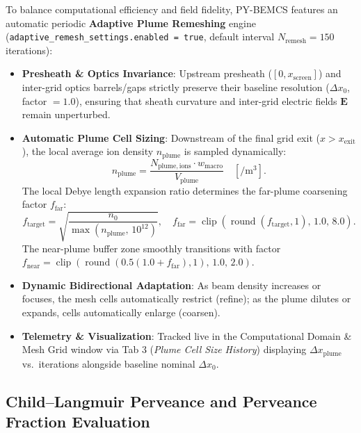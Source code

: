 \documentclass[11pt,a4paper]{article}
\newcommand{\PYBEMCS}{PY-BEMCS}
\begin{document}
To balance computational efficiency and field fidelity, \PYBEMCS{} features an automatic periodic \textbf{Adaptive Plume Remeshing} engine (\texttt{adaptive\_remesh\_settings.enabled = true}, default interval $N_{\mathrm{remesh}} = 150$ iterations):
\begin{itemize}[nosep]
    \item \textbf{Presheath \& Optics Invariance}: Upstream presheath ($[0, x_{\mathrm{screen}}]$) and inter-grid optics barrels/gaps strictly preserve their baseline resolution ($\Delta x_0$, factor $= 1.0$), ensuring that sheath curvature and inter-grid electric fields $\mathbf{E}$ remain unperturbed.
    \item \textbf{Automatic Plume Cell Sizing}: Downstream of the final grid exit ($x > x_{\mathrm{exit}}$), the local average ion density $n_{\mathrm{plume}}$ is sampled dynamically:
    \begin{equation}
        n_{\mathrm{plume}} = \frac{N_{\mathrm{plume,ions}} \cdot w_{\mathrm{macro}}}{V_{\mathrm{plume}}} \quad [\si{\per\meter\cubed}].
    \end{equation}
    The local Debye length expansion ratio determines the far-plume coarsening factor $f_{\mathrm{far}}$:
    \begin{equation}
        f_{\mathrm{target}} = \sqrt{\frac{n_0}{\max(n_{\mathrm{plume}}, \, 10^{12})}}, \quad f_{\mathrm{far}} = \operatorname{clip}\left(\operatorname{round}(f_{\mathrm{target}}, 1), \, 1.0, \, 8.0\right).
    \end{equation}
    The near-plume buffer zone smoothly transitions with factor $f_{\mathrm{near}} = \operatorname{clip}\left(\operatorname{round}(0.5(1.0 + f_{\mathrm{far}}), 1), \, 1.0, \, 2.0\right)$.
    \item \textbf{Dynamic Bidirectional Adaptation}: As beam density increases or focuses, the mesh cells automatically restrict (refine); as the plume dilutes or expands, cells automatically enlarge (coarsen).
    \item \textbf{Telemetry \& Visualization}: Tracked live in the Computational Domain \& Mesh Grid window via Tab 3 (\emph{Plume Cell Size History}) displaying $\Delta x_{\mathrm{plume}}$ vs.\ iterations alongside baseline nominal $\Delta x_0$.
\end{itemize}

\subsection{Child--Langmuir Perveance and Perveance Fraction Evaluation}
\label{sec:perveance_formulation}
\end{document}
